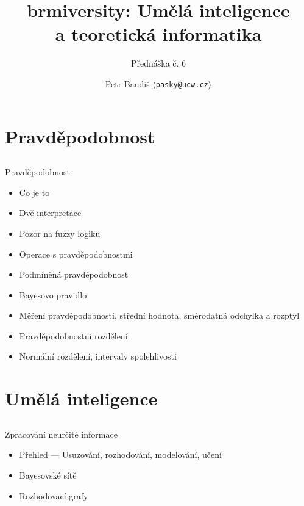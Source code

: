 \documentclass{beamer}
\begin{document}

\title{brmiversity: Umělá inteligence \\ a teoretická informatika}
\subtitle{Přednáška č. 6}
\author{Petr Baudiš $\langle${\tt pasky@ucw.cz}$\rangle$}
\date{}
\frame{\titlepage}

\section{Pravděpodobnost}

\subsection{}
\begin{frame}{Pravděpodobnost}
\begin{itemize}
\item Co je to
\item Dvě interpretace
\item Pozor na fuzzy logiku
\item Operace s pravděpodobnostmi
\item Podmíněná pravděpodobnost
\item Bayesovo pravidlo
\item Měření pravděpodobnosti, střední hodnota, směrodatná odchylka a rozptyl
\item Pravděpodobnostní rozdělení
\item Normální rozdělení, intervaly spolehlivosti
\end{itemize}
\end{frame}

\section{Umělá inteligence}

\subsection{}
\begin{frame}{Zpracování neurčité informace}
\begin{itemize}
\item Přehled --- Usuzování, rozhodování, modelování, učení
\item Bayesovské sítě
\item Rozhodovací grafy
\end{itemize}
\end{frame}
\end{document}
